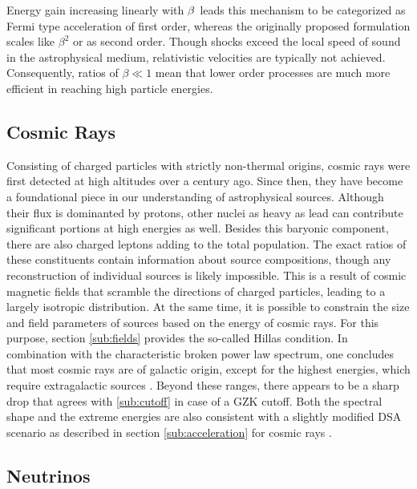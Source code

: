 Energy gain increasing linearly with $\kern-0.5pt \beta \kern+1.0pt$ leads this mechanism to be categorized as Fermi type acceleration
of first order, whereas the originally proposed formulation scales like $\beta^2$ or as second order. Though shocks exceed the local
speed of sound in the astrophysical medium, relativistic velocities are typically not achieved. Consequently, ratios of $\beta \ll 1$
mean that lower order processes are much more efficient in reaching high particle energies.



\subsection{Cosmic Rays}
\label{sub:rays}

Consisting of charged particles with strictly non-thermal origins, cosmic rays were first detected at high altitudes over a
century ago. Since then, they have become a foundational piece in our understanding of astrophysical sources. Although their flux
is dominanted by protons, other nuclei as heavy as lead can contribute significant portions at high energies as well. Besides this
baryonic component, there are also charged leptons adding to the total population. The exact ratios of these constituents contain
information about source compositions, though any reconstruction of individual sources is likely impossible. This is a result
of cosmic magnetic fields that scramble the directions of charged particles, leading to a largely isotropic distribution. At the
same time, it is possible to constrain the size and field parameters of sources based on the energy of cosmic rays. For this
purpose, section \ref{sub:fields} provides the so-called Hillas condition. In combination with the characteristic broken power
law spectrum, one concludes that most cosmic rays are of galactic origin, except for the highest energies, which require
extragalactic sources \cite{Tjus_2020, Drury_2012}. Beyond these ranges, there appears to be a sharp drop that agrees with
\ref{sub:cutoff} in case of a GZK cutoff. Both the spectral shape and the extreme energies are also consistent with a slightly
modified DSA scenario as described in section \ref{sub:acceleration} for cosmic rays \cite{Becker_2008}.



\subsection{Neutrinos}
\label{sub:neutrinos}

